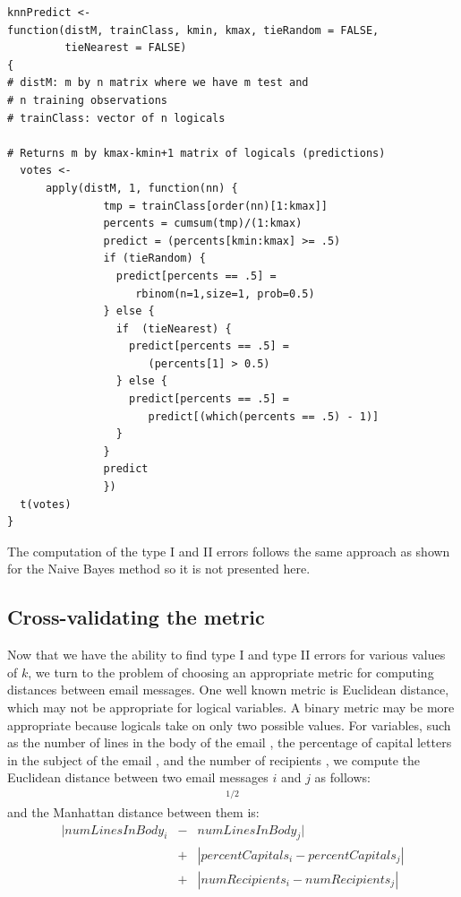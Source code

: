 \begin{verbatim}
knnPredict <-
function(distM, trainClass, kmin, kmax, tieRandom = FALSE, 
         tieNearest = FALSE)
{
# distM: m by n matrix where we have m test and 
# n training observations
# trainClass: vector of n logicals

# Returns m by kmax-kmin+1 matrix of logicals (predictions)
  votes <-
      apply(distM, 1, function(nn) {
               tmp = trainClass[order(nn)[1:kmax]]
               percents = cumsum(tmp)/(1:kmax)
               predict = (percents[kmin:kmax] >= .5)
               if (tieRandom) {
                 predict[percents == .5] = 
                    rbinom(n=1,size=1, prob=0.5)
               } else {
                 if  (tieNearest) {
                   predict[percents == .5] = 
                      (percents[1] > 0.5)
                 } else {
                   predict[percents == .5] = 
                      predict[(which(percents == .5) - 1)]
                 }
               } 
               predict  
               })
  t(votes)
}
\end{verbatim}

The computation of the type I and II errors follows the same
approach as shown for the Naive Bayes method so it is not
presented here.


\subsection{Cross-validating the metric}
Now that we have the ability to find type I and type II 
errors for various values of $k$, we turn to the problem
of choosing an appropriate metric for computing distances
between email messages.
One well known metric is Euclidean distance, which 
may not be appropriate for logical variables.
A binary metric may be more appropriate because logicals
take on only two possible values.  
For variables, such as the number of lines in the
body of the email , 
the percentage of capital letters in the subject of the email
, 
and the number of recipients ,
we compute the Euclidean distance between two email
messages $i$ and $j$ as follows:
\begin{eqnarray*}
 [(numLinesInBody_i &-& numLinesInBody_j)^2 \\
   &+& (percentCapitals_i - percentCapitals_j)^2\\
     &+& (numRecipients_i - numRecipients_j)^2 ]^{1/2} 
\end{eqnarray*}
and the Manhattan distance between them is:
\begin{eqnarray*}
  |numLinesInBody_i &-& numLinesInBody_j|\\
    &+& |percentCapitals_i - percentCapitals_j|\\
      &+& |numRecipients_i - numRecipients_j|
\end{eqnarray*}

